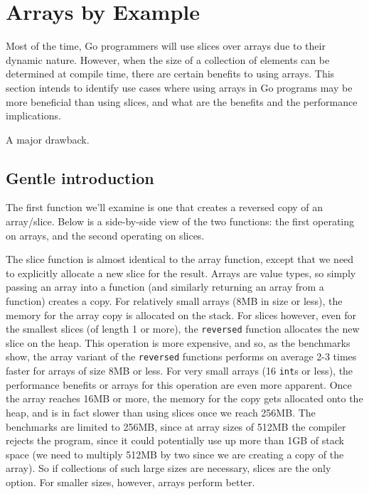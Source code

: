 \section{Arrays by Example}

Most of the time, Go programmers will use slices over arrays due to their
dynamic nature. However, when the size of a collection of elements can be
determined at compile time, there are certain benefits to using arrays. This
section intends to identify use cases where using arrays in Go programs may be
more beneficial than using slices, and what are the benefits and the performance
implications.

A major drawback.

\subsection{Gentle introduction}

The first function we'll examine is one that creates a reversed copy of an
array/slice. Below is a side-by-side view of the two functions: the first
operating on arrays, and the second operating on slices.






The slice function is almost identical to the array function, except that we
need to explicitly allocate a new slice for the result. Arrays are value types,
so simply passing an array into a function (and similarly returning an array
from a function) creates a copy. For relatively small arrays (8MB in size or
less), the memory for the array copy is allocated on the stack. For slices
however, even for the smallest slices (of length 1 or more), the
\texttt{reversed} function allocates the new slice on the heap. This operation
is more expensive, and so, as the benchmarks show, the array variant of the
\texttt{reversed} functions performs on average 2-3 times faster for arrays of
size 8MB or less. For very small arrays (16 \texttt{int}s or less), the
performance benefits or arrays for this operation are even more apparent. Once
the array reaches 16MB or more, the memory for the copy gets allocated onto the
heap, and is in fact slower than using slices once we reach 256MB. The
benchmarks are limited to 256MB, since at array sizes of 512MB the compiler
rejects the program, since it could potentially use up more than 1GB of stack
space (we need to multiply 512MB by two since we are creating a copy of the
array). So if collections of such large sizes are necessary, slices are the only
option. For smaller sizes, however, arrays perform better.

